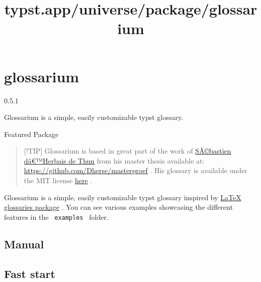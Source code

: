 \title{typst.app/universe/package/glossarium}

\label{banner}
\section{glossarium}\label{glossarium}

{ 0.5.1 }

Glossarium is a simple, easily customizable typst glossary.

{ } Featured Package

\label{readme}
\begin{quote}
{[}!TIP{]} Glossarium is based in great part of the work of
\href{https://github.com/Dherse}{SÃ©bastien dâ€™Herbais de Thun} from
his master thesis available at:
\url{https://github.com/Dherse/masterproef} . His glossary is available
under the MIT license
\href{https://github.com/Dherse/masterproef/blob/main/elems/acronyms.typ}{here}
.
\end{quote}

Glossarium is a simple, easily customizable typst glossary inspired by
\href{https://www.ctan.org/pkg/glossaries}{LaTeX glossaries package} .
You can see various examples showcasing the different features in the
\texttt{\ examples\ } folder.


\subsection{Manual}\label{manual}

\subsection{Fast start}\label{fast-start}

\begin{Shaded}
\begin{Highlighting}[]
\NormalTok{  (}
\NormalTok{  ),}
\NormalTok{)}
\NormalTok{)}
\end{Highlighting}
\end{Shaded}

